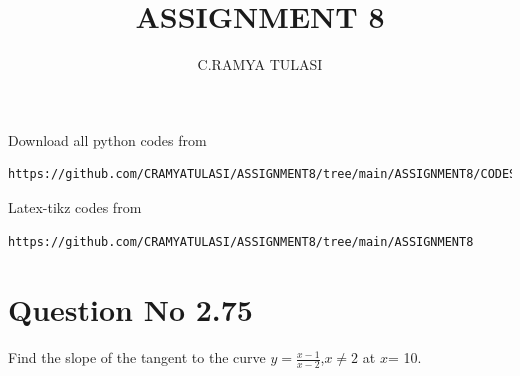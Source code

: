 \documentclass[journal,12pt,twocolumn]{IEEEtran}
\begin{document}
     \def\rightbox#1{\makebox[0in][r]{#1}}
     \def\centbox#1{\makebox[0in]{#1}}
     \def\topbox#1{\raisebox{-\baselineskip}[0in][0in]{#1}}
     \def\midbox#1{\raisebox{-0.5\baselineskip}[0in][0in]{#1}}
\vspace{3cm}
\title{ASSIGNMENT 8}
\author{C.RAMYA TULASI}
\maketitle
\newpage
\bigskip
\renewcommand{\thefigure}{\theenumi}
\renewcommand{\thetable}{\theenumi}
Download all python codes from 
\begin{lstlisting}
https://github.com/CRAMYATULASI/ASSIGNMENT8/tree/main/ASSIGNMENT8/CODES
\end{lstlisting}
%
Latex-tikz codes from 
%
\begin{lstlisting}
https://github.com/CRAMYATULASI/ASSIGNMENT8/tree/main/ASSIGNMENT8
\end{lstlisting}
%
\section{Question No 2.75}
Find the slope of the tangent to the curve  
$y=\frac{x-1}{x-2}$,$x \ne 2$ at $x$= 10.
\end{document}
